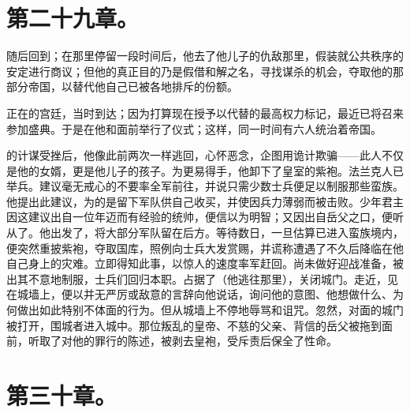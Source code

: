 
\section{第二十九章。}

随后回到；在那里停留一段时间后，他去了他儿子的仇敌那里，假装就公共秩序的安定进行商议；但他的真正目的乃是假借和解之名，寻找谋杀的机会，夺取他的那部分帝国，以替代他自己已被各地排斥的份额。\par

正在的宫廷，当时到达；因为打算现在授予以代替的最高权力标记，最近已将召来参加盛典。于是在他和面前举行了仪式；这样，同一时间有六人统治着帝国。\par

的计谋受挫后，他像此前两次一样逃回，心怀恶念，企图用诡计欺骗——此人不仅是他的女婿，更是他儿子的孩子。为更易得手，他卸下了皇室的紫袍。法兰克人已举兵。建议毫无戒心的不要率全军前往，并说只需少数士兵便足以制服那些蛮族。他提出此建议，为的是留下军队供自己收买，并使因兵力薄弱而被击败。少年君主因这建议出自一位年迈而有经验的统帅，便信以为明智；又因出自岳父之口，便听从了。他出发了，将大部分军队留在后方。等待数日，一旦估算已进入蛮族境内，便突然重披紫袍，夺取国库，照例向士兵大发赏赐，并谎称遭遇了不久后降临在他自己身上的灾难。立即得知此事，以惊人的速度率军赶回。尚未做好迎战准备，被出其不意地制服，士兵们回归本职。占据了（他逃往那里），关闭城门。走近，见在城墙上，便以并无严厉或敌意的言辞向他说话，询问他的意图、他想做什么、为何做出如此特别不体面的行为。但从城墙上不停地辱骂和诅咒。忽然，对面的城门被打开，围城者进入城中。那位叛乱的皇帝、不慈的父亲、背信的岳父被拖到面前，听取了对他的罪行的陈述，被剥去皇袍，受斥责后保全了性命。\par


\section{第三十章。}

